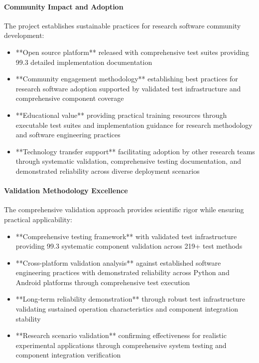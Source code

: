 \documentclass[11pt,a4paper]{article}
\begin{document}
\paragraph{Community Impact and Adoption}

The project establishes sustainable practices for research software community development:

\begin{itemize}
\item **Open source platform** released with comprehensive test suites providing 99.3%
  detailed implementation documentation
\item **Community engagement methodology** establishing best practices for research software adoption supported by
  validated test infrastructure and comprehensive component coverage
\item **Educational value** providing practical training resources through executable test suites and implementation
  guidance for research methodology and software engineering practices
\item **Technology transfer support** facilitating adoption by other research teams through systematic validation,
  comprehensive testing documentation, and demonstrated reliability across diverse deployment scenarios

\end{itemize}
\paragraph{Validation Methodology Excellence}

The comprehensive validation approach provides scientific rigor while ensuring practical applicability:

\begin{itemize}
\item **Comprehensive testing framework** with validated test infrastructure providing 99.3%
  systematic component validation across 219+ test methods
\item **Cross-platform validation analysis** against established software engineering practices with demonstrated
  reliability across Python and Android platforms through comprehensive test execution
\item **Long-term reliability demonstration** through robust test infrastructure validating sustained operation
  characteristics and component integration stability
\item **Research scenario validation** confirming effectiveness for realistic experimental applications through
  comprehensive system testing and component integration verification

\end{itemize}
\end{document}
